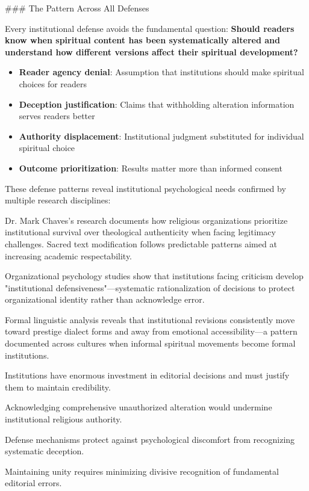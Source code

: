 \documentclass[12pt,twoside]{book}
\begin{document}
\#\#\# The Pattern Across All Defenses

Every institutional defense avoids the fundamental question: \textbf{\textbf{\textbf{Should readers know when spiritual content has been systematically altered and understand how different versions affect their spiritual development?}}}

\begin{itemize}
\item \textbf{\textbf{Reader agency denial}}: Assumption that institutions should make spiritual choices for readers
\item \textbf{\textbf{Deception justification}}: Claims that withholding alteration information serves readers better
\item \textbf{\textbf{Authority displacement}}: Institutional judgment substituted for individual spiritual choice
\item \textbf{\textbf{Outcome prioritization}}: Results matter more than informed consent
\end{itemize}

These defense patterns reveal institutional psychological needs confirmed by multiple research disciplines:

Dr. Mark Chaves's research documents how religious organizations prioritize institutional survival over theological authenticity when facing legitimacy challenges. Sacred text modification follows predictable patterns aimed at increasing academic respectability.

Organizational psychology studies show that institutions facing criticism develop "institutional defensiveness"—systematic rationalization of decisions to protect organizational identity rather than acknowledge error.

Formal linguistic analysis reveals that institutional revisions consistently move toward prestige dialect forms and away from emotional accessibility—a pattern documented across cultures when informal spiritual movements become formal institutions.

Institutions have enormous investment in editorial decisions and must justify them to maintain credibility.

Acknowledging comprehensive unauthorized alteration would undermine institutional religious authority.

Defense mechanisms protect against psychological discomfort from recognizing systematic deception.

Maintaining unity requires minimizing divisive recognition of fundamental editorial errors.
\end{document}
